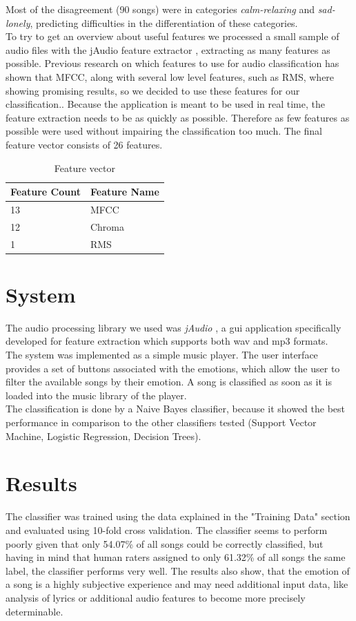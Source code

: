 \documentclass{sigchi-ext}
\begin{document}
Most of the disagreement (90 songs) were in categories \textit{calm-relaxing} and \textit{sad-lonely}, predicting difficulties in the differentiation of these categories.\\

To try to get an overview about useful features we processed a small sample of audio files with the jAudio feature extractor \cite{McEnnis2005}, extracting as many features as possible.
Previous research on which features to use for audio classification has shown that MFCC, along with several low level features, such as RMS, where showing promising results, so we decided to use these features for our classification.\cite{Mckinney2003, Mandel2005, Tzanetakis2001}.  Because the application is meant to be used in real time, the feature extraction needs to be as quickly as possible. Therefore as few features as possible were used without impairing the classification too much. The final feature vector consists of 26 features.

\begin{table}
  \centering
  \begin{tabular}{@{}ll@{}}
    Feature Count & Feature Name \\ \midrule
    13 & MFCC \\
    12 & Chroma \\
    1  & RMS
  \end{tabular}
  \caption{Feature vector}
  \label{feature-vector}
\end{table}

\section{System}
The audio processing library we used was \textit{jAudio} \cite{McEnnis2005}, a gui application specifically developed for feature extraction which supports both wav and mp3 formats.\\
The system was implemented as a simple music player. The user interface provides a set of buttons associated with the emotions, which allow the user to filter the available songs by their emotion. A song is classified as soon as it is loaded into the music library of the player.\\
The classification is done by a Naive Bayes classifier, because it showed the best performance in comparison to the other classifiers tested (Support Vector Machine, Logistic Regression, Decision Trees).

\section{Results}
The classifier was trained using the data explained in the "Training Data" section and evaluated using 10-fold cross validation. The classifier seems to perform poorly given that only 54.07\% of all songs could be correctly classified, but having in mind that human raters assigned to only 61.32\% of all songs the same label, the classifier performs very well. The results also show, that the emotion of a song is a highly subjective experience and may need additional input data, like analysis of lyrics or additional audio features to become more precisely determinable.
\end{document}
